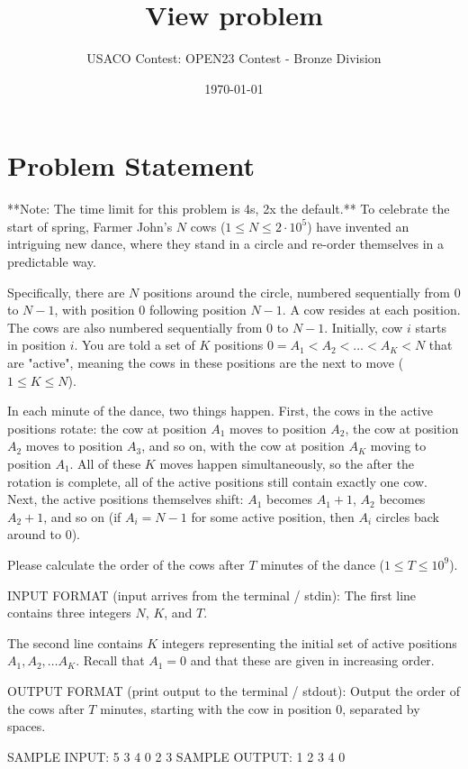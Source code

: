 \documentclass[12pt]{article}
\title{View problem}
\author{USACO Contest: OPEN23 Contest - Bronze Division}
\date{\today}
\begin{document}
\maketitle

\section*{Problem Statement}


**Note: The time limit for this problem is 4s, 2x the default.**
To celebrate the start of spring, Farmer John's $N$ cows ($1 \leq N \leq 2 \cdot 10^5$) have invented an intriguing new dance, where they stand in a circle and re-order themselves in a predictable way.

Specifically, there are $N$ positions around the circle, numbered sequentially from $0$ to $N-1$, with position $0$ following position $N-1$.  A cow resides at each position.  The cows are also numbered sequentially from $0$ to $N-1$.  Initially, cow $i$ starts in position $i$.  You are told a set of $K$ positions $0=A_1<A_2< \ldots< A_K<N$ that are "active", meaning the cows in these positions are the next to move ($1 \leq K \leq N$).  

In each minute of the dance, two things happen.  First, the cows in the active positions rotate: the cow at position $A_1$ moves to position $A_2$, the cow at position $A_2$ moves to position $A_3$, and so on, with the cow at position $A_K$ moving to position $A_1$.  All of these $K$ moves happen simultaneously, so the after the rotation is complete, all of the active positions still contain exactly one cow.  Next, the active positions themselves shift:
$A_1$ becomes $A_1+1$, $A_2$ becomes $A_2+1$, and so on (if $A_i = N-1$ for some active position, then $A_i$ circles back around to $0$).

Please calculate the order of the cows after $T$ minutes of the dance ($1\le T\le 10^9$).

INPUT FORMAT (input arrives from the terminal / stdin):
The first line contains three integers $N$, $K$, and $T$.

The second line contains $K$ integers representing the initial set of active positions
$A_1,A_2, \ldots A_K$.  Recall that $A_1 = 0$ and that these are given in increasing order.

OUTPUT FORMAT (print output to the terminal / stdout):
Output the order of the cows after $T$ minutes, starting with the cow in position $0$, separated by
spaces.

SAMPLE INPUT:
5 3 4
0 2 3
SAMPLE OUTPUT: 
1 2 3 4 0
\end{document}
